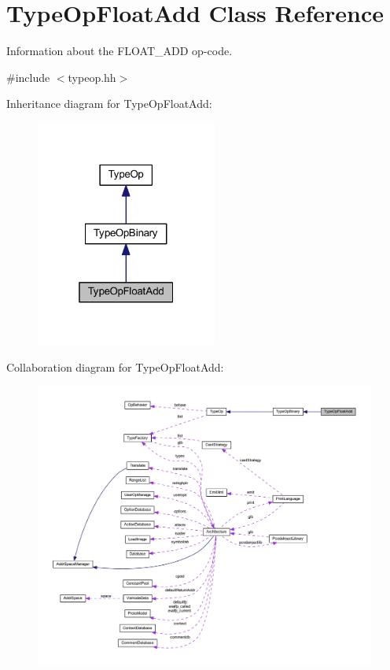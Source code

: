 \hypertarget{class_type_op_float_add}{}\section{Type\+Op\+Float\+Add Class Reference}
\label{class_type_op_float_add}


Information about the F\+L\+O\+A\+T\+\_\+\+A\+DD op-\/code.  




{\ttfamily \#include $<$typeop.\+hh$>$}



Inheritance diagram for Type\+Op\+Float\+Add\+:
\nopagebreak
\begin{figure}[H]
\begin{center}
\leavevmode
\includegraphics[width=169pt]{class_type_op_float_add__inherit__graph}
\end{center}
\end{figure}


Collaboration diagram for Type\+Op\+Float\+Add\+:
\nopagebreak
\begin{figure}[H]
\begin{center}
\leavevmode
\includegraphics[width=350pt]{class_type_op_float_add__coll__graph}
\end{center}
\end{figure}
